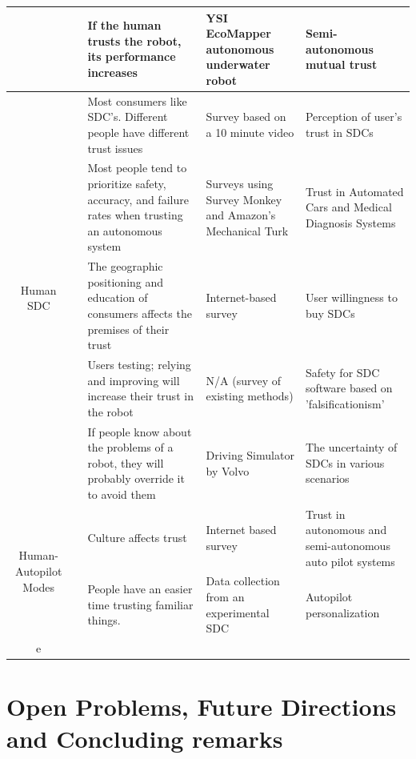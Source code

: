 \documentclass[runningheads,a4paper]{llncs}
\begin{document}
\begin{center}
\begin{longtable}{|c|c|p{4cm}|p{2cm}|p{2cm}|}
    \\ \cline{2-5} 
    & \cite{wang2014human}
    & If the human trusts the robot, its performance increases
    & YSI EcoMapper autonomous underwater robot         
    & Semi-autonomous mutual trust
    \\ \hline
\multirow{5}{*}{Human SDC}      
    & \cite{howard2014public}  
    & Most consumers like SDC's. Different people have different trust issues                     
    & Survey based on a 10 minute video                        
    & Perception of user's trust in SDCs
    \\ \cline{2-5} 
    & \cite{carlson2014identifying}
    & Most people tend to prioritize safety, accuracy, and failure rates when trusting an autonomous system                       
    & Surveys using  Survey Monkey and Amazon’s Mechanical Turk                  
    & Trust in Automated Cars and Medical Diagnosis Systems               
    \\ \cline{2-5} 
    & \cite{kyriakidis2015public}
    & The geographic positioning and education of consumers affects the premises of their trust 
    & Internet-based survey                    
    & User willingness to buy SDCs
    \\ \cline{2-5} 
    & \cite{wagner2015philosophy}    
    & Users testing; relying and improving will increase their trust in the robot 
    & N/A (survey of existing methods)         
    & Safety for SDC software based on 'falsificationism'
    \\ \cline{2-5} 
    & \cite{helldin2013presenting}
    & If people know about the problems of a robot, they will probably override it to avoid them            
    & Driving Simulator by Volvo  
    & The uncertainty of SDCs in various scenarios            
    \\ \hline
    
    \multirow{2}{*}{Human-Autopilot Modes}    
    & \cite{winter2015indian}
    & Culture affects trust                        
    & Internet based survey               
    & Trust in autonomous and semi-autonomous auto pilot systems        
    \\ \cline{2-5} 
    & \cite{butakov2015driving}
    & People have an easier time trusting familiar things.                   
    & Data collection from an experimental SDC
    & Autopilot personalization
    \\ \hline
    
e

\end{longtable}
\end{center}

\section{Open Problems, Future Directions and Concluding remarks}
%

\end{document}
